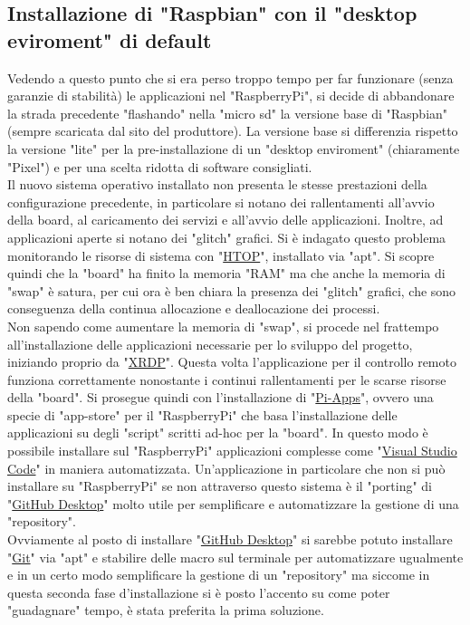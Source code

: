 \subsection{Installazione di "Raspbian" con il "desktop eviroment" di default}
Vedendo a questo punto che si era perso troppo tempo per far funzionare (senza garanzie di stabilità) le applicazioni nel "RaspberryPi", si decide di abbandonare la strada precedente "flashando" nella "micro sd" la versione base di "Raspbian" (sempre scaricata dal sito del produttore). La versione base si differenzia rispetto la versione "lite" per la pre-installazione di un "desktop enviroment" (chiaramente "Pixel") e per una scelta ridotta di software consigliati.\\
Il nuovo sistema operativo installato non presenta le stesse prestazioni della configurazione precedente, in particolare si notano dei rallentamenti all'avvio della board, al caricamento dei servizi e all'avvio delle applicazioni. Inoltre, ad applicazioni aperte si notano dei "glitch" grafici. Si è indagato questo problema monitorando le risorse di sistema con "\href{https://htop.dev/}{HTOP}", installato via "apt". Si scopre quindi che la "board" ha finito la memoria "RAM" ma che anche la memoria di "swap" è satura, per cui ora è ben chiara la presenza dei "glitch" grafici, che sono conseguenza della continua allocazione e deallocazione dei processi.\\
Non sapendo come aumentare la memoria di "swap", si procede nel frattempo all'installazione delle applicazioni necessarie per lo sviluppo del progetto, iniziando proprio da "\href{https://github.com/neutrinolabs/xrdp}{XRDP}". Questa volta l'applicazione per il controllo remoto funziona correttamente nonostante i continui rallentamenti per le scarse risorse della "board". Si prosegue quindi con l'installazione di "\href{https://pi-apps.io/}{Pi-Apps}", ovvero una specie di "app-store" per il "RaspberryPi" che basa l'installazione delle applicazioni su degli "script" scritti ad-hoc per la "board". In questo modo è possibile installare sul "RaspberryPi" applicazioni complesse come "\href{https://code.visualstudio.com/}{Visual Studio Code}" in maniera automatizzata. Un'applicazione in particolare che non si può installare su "RaspberryPi" se non attraverso questo sistema è il "porting" di "\href{https://desktop.github.com/}{GitHub Desktop}" molto utile per semplificare e automatizzare la gestione di una "repository".\\
Ovviamente al posto di installare "\href{https://desktop.github.com/}{GitHub Desktop}" si sarebbe potuto installare "\href{https://git-scm.com/}{Git}" via "apt" e stabilire delle macro sul terminale per automatizzare ugualmente e in un certo modo semplificare la gestione di un "repository" ma siccome in questa seconda fase d'installazione si è posto l'accento su come poter "guadagnare" tempo, è stata preferita la prima soluzione.\\

